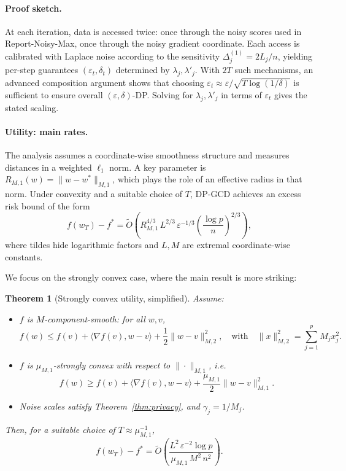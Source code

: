 \documentclass[11pt,a4paper]{article}
\newtheorem{theorem}{Theorem}
\begin{document}
\paragraph{Proof sketch.} At each iteration, data is accessed twice: once through the noisy scores used in Report-Noisy-Max, once through the noisy gradient coordinate. Each access is calibrated with Laplace noise according to the sensitivity $\Delta_j^{(1)} = 2L_j/n$, yielding per-step guarantees $(\varepsilon_t, \delta_t)$ determined by $\lambda_j, \lambda'_j$. With $2T$ such mechanisms, an advanced composition argument shows that choosing $\varepsilon_t \approx \varepsilon/\sqrt{T \log(1/\delta)}$ is sufficient to ensure overall $(\varepsilon, \delta)$-DP. Solving for $\lambda_j, \lambda'_j$ in terms of $\varepsilon_t$ gives the stated scaling.

\paragraph{Utility: main rates.} The analysis assumes a coordinate-wise smoothness structure and measures distances in a weighted $\ell_1$ norm. A key parameter is $R_{M,1}(w) = \|w - w^*\|_{M,1}$, which plays the role of an effective radius in that norm. Under convexity and a suitable choice of $T$, DP-GCD achieves an excess risk bound of the form
\[
f(w_T) - f^* = \widetilde{O}\!\left( R_{M,1}^{4/3} \, L^{2/3} \, \varepsilon^{-1/3} \left(\frac{\log p}{n}\right)^{2/3} \right),
\]
where tildes hide logarithmic factors and $L, M$ are extremal coordinate-wise constants.

We focus on the strongly convex case, where the main result is more striking:

\begin{theorem}[Strongly convex utility, simplified]
\label{thm:sc}
Assume:
\begin{itemize}
\item $f$ is $M$-component-smooth: for all $w, v$,
\[
f(w) \leq f(v) + \langle \nabla f(v), w - v \rangle + \frac{1}{2} \|w - v\|_{M,2}^2,
\quad \text{with} \quad \|x\|_{M,2}^2 = \sum_{j=1}^p M_j x_j^2.
\]
\item $f$ is $\mu_{M,1}$-strongly convex with respect to $\|\cdot\|_{M,1}$, i.e.
\[
f(w) \geq f(v) + \langle \nabla f(v), w - v \rangle + \frac{\mu_{M,1}}{2} \|w - v\|_{M,1}^2.
\]
\item Noise scales satisfy Theorem~\ref{thm:privacy}, and $\gamma_j = 1/M_j$.
\end{itemize}
Then, for a suitable choice of $T \approx \mu_{M,1}^{-1}$,
\[
f(w_T) - f^* = \widetilde{O}\!\left( \frac{L^2 \, \varepsilon^{-2} \log p}{\mu_{M,1} \, M^2 \, n^2} \right).
\]
\end{theorem}
\end{document}
